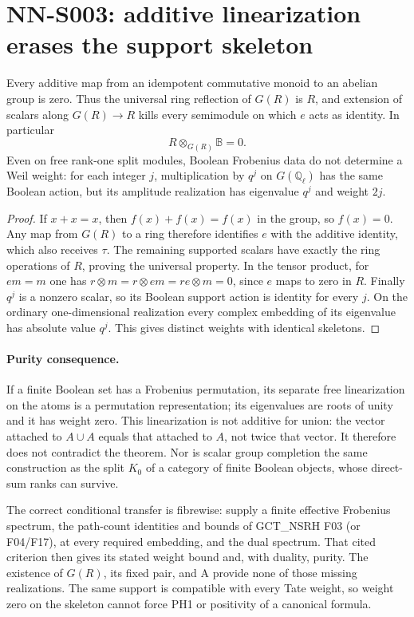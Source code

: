 \section{NN-S003: additive linearization erases the support skeleton}
\label{sec:NN-S003}

\begin{theorem}[NN-S003]
Every additive map from an idempotent commutative monoid to an
abelian group is zero. Thus the universal ring reflection of $G(R)$
is $R$, and extension of scalars along $G(R)\to R$ kills every
semimodule on which $e$ acts as identity. In particular
\[
 R\otimes_{G(R)}\mathbb B=0.
\]
Even on free rank-one split modules, Boolean Frobenius data do not
determine a Weil weight: for each integer $j$, multiplication by
$q^j$ on $G(\mathbb Q_\ell)$ has the same Boolean action, but its
amplitude realization has eigenvalue $q^j$ and weight $2j$.
\end{theorem}

\begin{proof}
If $x+x=x$, then $f(x)+f(x)=f(x)$ in the group, so $f(x)=0$.
Any map from $G(R)$ to a ring therefore identifies $e$ with the
additive identity, which also receives $\tau$. The remaining
supported scalars have exactly the ring operations of $R$, proving
the universal property. In the tensor product, for $em=m$ one has
$r\otimes m=r\otimes em=re\otimes m=0$, since $e$ maps to zero
in $R$. Finally $q^j$ is a nonzero scalar, so its Boolean support
action is identity for every $j$. On the ordinary one-dimensional
realization every complex embedding of its eigenvalue has absolute
value $q^j$. This gives distinct weights with identical skeletons.
\end{proof}

\paragraph{Purity consequence.}
If a finite Boolean set has a Frobenius permutation, its separate
free linearization on the atoms is a permutation representation;
its eigenvalues are roots of unity and it has weight zero. This
linearization is not additive for union: the vector attached to
$A\cup A$ equals that attached to $A$, not twice that vector.
It therefore does not contradict the theorem. Nor is scalar
group completion the same construction as the split $K_0$ of a
category of finite Boolean objects, whose direct-sum ranks can survive.

The correct conditional transfer is fibrewise: supply a finite
effective Frobenius spectrum, the path-count identities and bounds
of GCT\_NSRH F03 (or F04/F17), at every required embedding, and the
dual spectrum. That cited criterion then gives its stated weight
bound and, with duality, purity. The existence of $G(R)$, its fixed
pair, and A provide none of those missing realizations. The same
support is compatible with every Tate weight, so weight zero on
the skeleton cannot force PH1 or positivity of a canonical formula.

